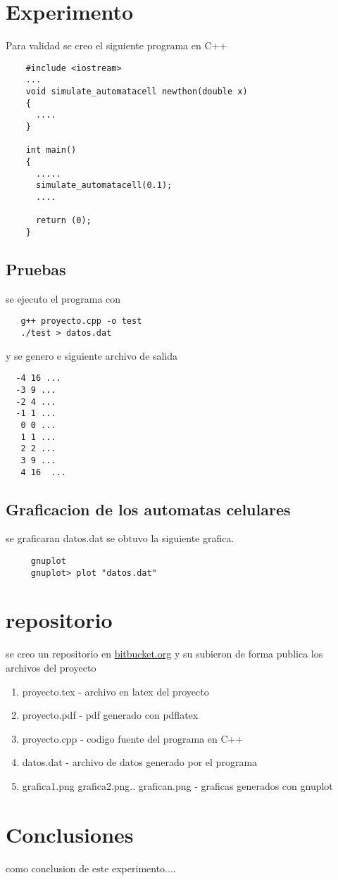 \documentclass[a4paper,12pt]{article}
\begin{document}
  

\section{Experimento}
  Para validad se creo el siguiente programa en C++

  \begin{verbatim}
    #include <iostream>
    ...
    void simulate_automatacell newthon(double x)
    {
      ....
    }

    int main()
    {
      .....
      simulate_automatacell(0.1);
      ....

      return (0);
    }

  \end{verbatim}

 

 \subsection{Pruebas}

  se ejecuto el programa con 

  \begin{verbatim}
   g++ proyecto.cpp -o test
   ./test > datos.dat 

  \end{verbatim}

  y se genero e siguiente archivo de salida

  \begin{verbatim}
  -4 16 ...
  -3 9 ...
  -2 4 ...
  -1 1 ...
   0 0 ...
   1 1 ...
   2 2 ...
   3 9 ...
   4 16  ...
  \end{verbatim}

 \subsection{Graficacion de los automatas celulares}
   se graficaran datos.dat se obtuvo la siguiente grafica.
   \begin{verbatim}
     gnuplot
     gnuplot> plot "datos.dat"
    \end{verbatim}



\section{repositorio}
 se creo un repositorio en \url{bitbucket.org} y su subieron de forma publica
 los archivos del proyecto 
 \begin{enumerate} 
  \item proyecto.tex - archivo en latex del proyecto 
  \item proyecto.pdf - pdf generado con pdflatex
  \item proyecto.cpp - codigo fuente del programa en C++
  \item datos.dat    - archivo de datos generado por el programa
  \item grafica1.png grafica2.png.. grafican.png - graficas generados con gnuplot
 \end{enumerate}

 
\section{Conclusiones}
 como conclusion de este experimento....
\end{document}
